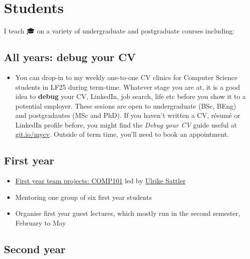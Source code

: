 \documentclass[12pt,]{book}
\providecommand{\tightlist}{%
  \setlength{\itemsep}{0pt}\setlength{\parskip}{0pt}}
\begin{document}
\hypertarget{teaching}{%
\chapter{Students}\label{teaching}}

I teach 🎓 on a variety of undergraduate and postgraduate courses including:

\hypertarget{all-years-debug-your-cv}{%
\section{All years: debug your CV}\label{all-years-debug-your-cv}}

\begin{itemize}
\tightlist
\item
  You can drop-in to my weekly one-to-one CV clinics for Computer Science students in LF25 during term-time. Whatever stage you are at, it is a good idea to \textbf{debug} your CV, LinkedIn, job search, life etc before you show it to a potential employer. These sesions are open to undergraduate (BSc, BEng) and postgradautes (MSc and PhD). If you haven't written a CV, résumé or LinkedIn profile before, you might find the \emph{Debug your CV} guide useful at \href{http://git.io/mycv}{git.io/mycv}. Outside of term time, you'll need to book an appointment.
\end{itemize}

\hypertarget{first-year}{%
\section{First year}\label{first-year}}

\begin{itemize}
\tightlist
\item
  \href{https://studentnet.cs.manchester.ac.uk/ugt/COMP10120/syllabus/}{First year team projects: COMP101} led by \href{http://www.cs.man.ac.uk/~sattler/}{Ulrike Sattler}
\item
  Mentoring one group of six first year students
\item
  Organise first year guest lectures, which mostly run in the second semester, February to May
\end{itemize}

\hypertarget{second-year}{%
\section{Second year}\label{second-year}}
\end{document}
